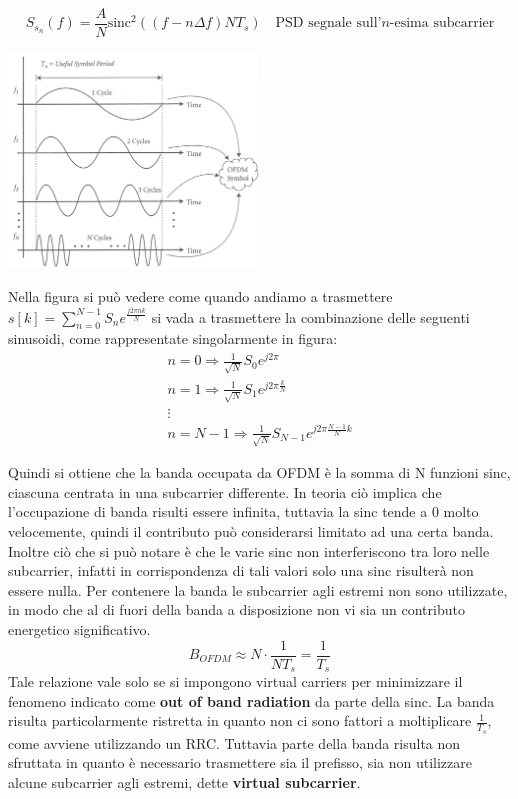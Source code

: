 
\[
    S_{s_n}(f) = \frac{A}{N} \text{sinc}^2 ((f-n\Delta f)N T_s) \quad \text{PSD segnale sull'$n$-esima subcarrier}
\]
\begin{center}
    \includegraphics[width=0.5\textwidth]{imgs/ofdm_sinc.png}
\end{center}

Nella figura si può vedere come quando andiamo a trasmettere $s[k] = \sum_{n=0}^{N-1} S_n e^{\frac{j2\pi n k}{N}}$ si vada a trasmettere la combinazione delle seguenti sinusoidi, come rappresentate singolarmente in figura:
\[
    \begin{array}{ll}
        n = 0 \Rightarrow \frac{1}{\sqrt{N}} S_0 e^{j2\pi} \\
        n = 1 \Rightarrow \frac{1}{\sqrt{N}} S_1 e^{j2\pi \frac{k}{N}} \\
        \vdots \\
        n = N-1 \Rightarrow \frac{1}{\sqrt{N}} S_{N-1} e^{j2\pi \frac{N-1}{N} k}
    \end{array}
\]



Quindi si ottiene che la banda occupata da OFDM è la somma di N funzioni sinc, ciascuna centrata in una subcarrier differente. In teoria ciò implica che l'occupazione di banda risulti essere infinita, tuttavia la sinc tende a 0 molto velocemente, quindi il contributo può considerarsi limitato ad una certa banda. Inoltre ciò che si può notare è che le varie sinc non interferiscono tra loro nelle subcarrier, infatti in corrispondenza di tali valori solo una sinc risulterà non essere nulla. Per contenere la banda le subcarrier agli estremi non sono utilizzate, in modo che al di fuori della banda a disposizione non vi sia un contributo energetico significativo.
\[
    B_{OFDM} \approx N \cdot \frac{1}{NT_s} = \frac{1}{T_s}
\]
Tale relazione vale solo se si impongono virtual carriers per minimizzare il fenomeno indicato come \textbf{out of band radiation} da parte della sinc.
La banda risulta particolarmente ristretta in quanto non ci sono fattori a moltiplicare $\frac{1}{T_s}$, come avviene utilizzando un RRC. Tuttavia parte della banda risulta non sfruttata in quanto è necessario trasmettere sia il prefisso, sia non utilizzare alcune subcarrier agli estremi, dette \textbf{virtual subcarrier}.


